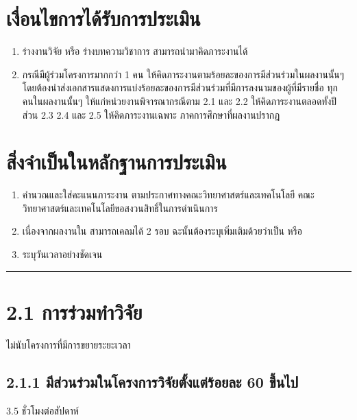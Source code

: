 \documentclass[a4paper,12pt,english]{sphinxmanual}
\begin{document}
\section{เงื่อนไขการได้รับการประเมิน}
\label{\detokenize{2research:id2}}\begin{enumerate}
%
\item {} 
ร่างงานวิจัย หรือ ร่างบทความวิชาการ  สามารถนำมาคิดภาระงานได้

\item {} 
กรณีมีผู้ร่วมโครงการมากกว่า 1 คน ให้คิดภาระงานตามร้อยละของการมีส่วนร่วมในผลงานนั้นๆ โดยต้องนำส่งเอกสารแสดงการแบ่งร้อยละของการมีส่วนร่วมที่มีการลงนามของผู้ที่มีรายชื่อ ทุกคนในผลงานนั้นๆ ให้แก่หน่วยงานพิจารณากรณีตาม 2.1 และ 2.2 ให้คิดภาระงานตลอดทั้งปี ส่วน 2.3 2.4 และ 2.5 ให้คิดภาระงานเฉพาะ ภาคการศึกษาที่ผลงานปรากฏ

\end{enumerate}


\section{สิ่งจำเป็นในหลักฐานการประเมิน}
\label{\detokenize{2research:id3}}\begin{enumerate}
%
\item {} 
 คำนวณและใส่คะแนนภาระงาน ตามประกาศทางคณะวิทยาศาสตร์และเทคโนโลยี คณะวิทยาศาสตร์และเทคโนโลยีขอสงวนสิทธิ์ในการดำเนินการ

\item {} 
เนื่องจากผลงานใน {\hyperref[\detokenize{2research:id10}]{}} สามารถเคลมได้ 2 รอบ ฉะนั้นต้องระบุเพิ่มเติมด้วยว่าเป็น  หรือ 

\item {} 
ระบุวันเวลาอย่างชัดเจน

\end{enumerate}


\bigskip\hrule\bigskip



\section{2.1 การร่วมทำวิจัย}
\label{\detokenize{2research:id4}}
ไม่นับโครงการที่มีการขยายระยะเวลา


\subsection{2.1.1 มีส่วนร่วมในโครงการวิจัยตั้งแต่ร้อยละ 60 ขึ้นไป}
\label{\detokenize{2research:id5}}
3.5 ชั่วโมงต่อสัปดาห์
\end{document}
